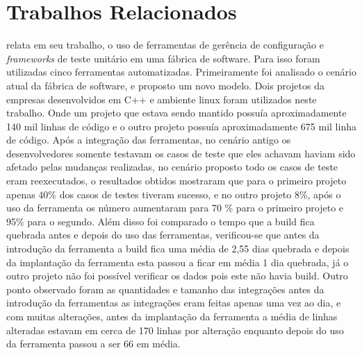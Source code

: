 
\chapter{Trabalhos Relacionados}\label{trabalhorel}

\cite{poliana2005} relata em seu trabalho, o uso de ferramentas de gerência de configuração e \textit{frameworks} de teste unitário em uma fábrica de software. Para isso foram utilizadas cinco ferramentas automatizadas. Primeiramente foi analisado o cenário atual da fábrica de software, e proposto um novo modelo. Dois projetos da empresas desenvolvidos em C++ e ambiente linux foram utilizados neste trabalho. Onde um projeto que estava sendo mantido possuía aproximadamente 140 mil linhas de código e o outro projeto possuía aproximadamente 675 mil linha de código. Após a integração das ferramentas, no cenário antigo os desenvolvedores somente testavam os casos de teste que eles achavam haviam sido afetado pelas mudanças realizadas, no cenário proposto todo os casos de teste eram reexecutados, o resultados obtidos mostraram que para o primeiro projeto apenas 40\% dos casos de testes tiveram sucesso, e no outro projeto 8\%, após o uso da ferramenta os número aumentaram para 70 \% para o primeiro projeto e 95\% para o segundo. Além disso foi comparado o tempo que a build fica quebrada antes e depois do uso das ferramentas, verificou-se que antes da introdução da ferramenta a build  fica uma média de 2,55 dias quebrada e depois da implantação da ferramenta esta passou a ficar em média 1 dia quebrada, já o outro projeto não foi possível verificar os dados pois este não havia build. Outro ponto observado foram as quantidades e tamanho das integrações antes da introdução da ferramentas as integrações eram feitas apenas uma vez ao dia, e com muitas alterações, antes da implantação da ferramenta a média de linhas alteradas estavam em cerca de 170 linhas por alteração enquanto depois do uso da ferramenta passou a ser 66 em média.